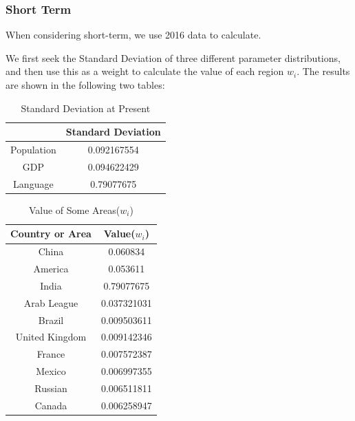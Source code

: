 \documentclass{mcmthesis}
\begin{document}
    \subsubsection{Short Term}
    When considering short-term, we use 2016 data to calculate.

    We first seek the Standard Deviation of three different parameter distributions,
    and then use this as a weight to calculate the value of each region $w_i$.
    The results are shown in the following two tables:


    \begin{table}[h]
      \centering
      \caption{Standard Deviation at Present}

      \begin{tabular}{cc}
        \toprule%
        &Standard Deviation\\
        \midrule%
        Population&0.092167554\\
        GDP&0.094622429\\
        Language&0.79077675\\
        \bottomrule%
      \end{tabular}
    \end{table}

    \begin{table}[h]
      \centering
      \caption{Value of Some Areas($w_i$)}

      \begin{tabular}{cc}
        \toprule%
        Country or Area&Value($w_i$)\\
        \midrule%
          China&0.060834\\
        America&0.053611\\
        India&0.79077675\\
        Arab League&0.037321031\\
        Brazil&0.009503611\\
        United Kingdom&0.009142346\\
        France&0.007572387\\
        Mexico&0.006997355\\
        Russian&0.006511811\\
        Canada&0.006258947\\
        \bottomrule%
      \end{tabular}
    \end{table}
\end{document}
